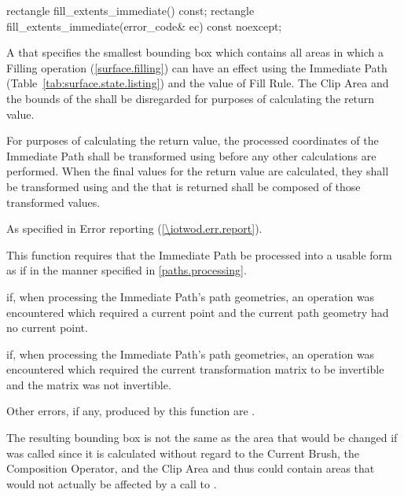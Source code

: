 \begin{itemdecl}
rectangle fill_extents_immediate() const;
rectangle fill_extents_immediate(error_code& ec) const noexcept;
\end{itemdecl}
\begin{itemdescr}
\pnum
\returns
A  that specifies the smallest bounding box which contains all areas in which a Filling operation (\ref{surface.filling}) can have an effect using the Immediate Path (Table~\ref{tab:surface.state.listing}) and the value of Fill Rule. The Clip Area and the bounds of the \underlyingsurface shall be disregarded for purposes of calculating the return value.

\pnum
For purposes of calculating the return value, the processed coordinates of the Immediate Path shall be transformed using  before any other calculations are performed. When the final values for the return value are calculated, they shall be transformed using  and the  that is returned shall be composed of those transformed values.

\pnum
\throws
As specified in Error reporting (\ref{\iotwod.err.report}).

\pnum
\remarks
This function requires that the Immediate Path be processed into a usable form as if in the manner specified in \ref{paths.processing}.

\pnum
\errors
{} if, when processing the Immediate Path's path geometries, an operation was encountered which required a current point and the current path geometry had no current point.

\pnum
{} if, when processing the Immediate Path's path geometries, an operation was encountered which required the current transformation matrix to be invertible and the matrix was not invertible.

\pnum
Other errors, if any, produced by this function are .

\pnum
\realnotes
The resulting bounding box is not the same as the area that would be changed if  was called since it is calculated without regard to the Current Brush, the Composition Operator, and the Clip Area and thus could contain areas that would not actually be affected by a call to .
\end{itemdescr}

